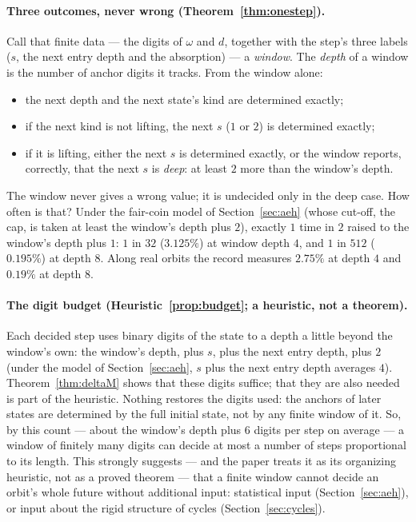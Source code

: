 \documentclass[11pt]{article}
\theoremstyle{remark}
\newcommand{\w}{\omega}
\begin{document}
\paragraph{Three outcomes, never wrong (Theorem~\ref{thm:onestep}).} Call that finite data --- the digits of $\w$ and $d$, together with the step's three labels ($s$, the next entry depth and the absorption) --- a \emph{window}. The \emph{depth} of a window is the number of anchor digits it tracks. From the window alone:
\begin{itemize}
\item the next depth and the next state's kind are determined exactly;
\item if the next kind is not lifting, the next $s$ ($1$ or $2$) is determined exactly;
\item if it is lifting, either the next $s$ is determined exactly, or the window reports, correctly, that the next $s$ is \emph{deep}: at least $2$ more than the window's depth.
\end{itemize}
The window never gives a wrong value; it is undecided only in the deep case. How often is that? Under the fair-coin model of Section~\ref{sec:aeh} (whose cut-off, the cap, is taken at least the window's depth plus $2$), exactly $1$ time in $2$ raised to the window's depth plus $1$: $1$ in $32$ ($3.125\%$) at window depth $4$, and $1$ in $512$ ($0.195\%$) at depth $8$. Along real orbits the record measures $2.75\%$ at depth $4$ and $0.19\%$ at depth $8$.

\paragraph{The digit budget (Heuristic~\ref{prop:budget}; a heuristic, not a theorem).} Each decided step uses binary digits of the state to a depth a little beyond the window's own: the window's depth, plus $s$, plus the next entry depth, plus $2$ (under the model of Section~\ref{sec:aeh}, $s$ plus the next entry depth averages $4$). Theorem~\ref{thm:deltaM} shows that these digits suffice; that they are also needed is part of the heuristic. Nothing restores the digits used: the anchors of later states are determined by the full initial state, not by any finite window of it. So, by this count --- about the window's depth plus $6$ digits per step on average --- a window of finitely many digits can decide at most a number of steps proportional to its length. This strongly suggests --- and the paper treats it as its organizing heuristic, not as a proved theorem --- that a finite window cannot decide an orbit's whole future without additional input: statistical input (Section~\ref{sec:aeh}), or input about the rigid structure of cycles (Section~\ref{sec:cycles}).
\end{document}
